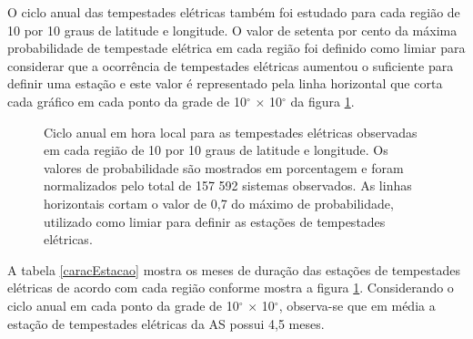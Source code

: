 
O ciclo anual das tempestades elétricas também foi estudado para cada região de 10 por 10 graus de latitude e longitude. O valor de setenta por cento da máxima probabilidade de tempestade elétrica em cada região foi definido como limiar para considerar que a ocorrência de tempestades elétricas aumentou o suficiente para definir uma estação e este valor é representado pela linha horizontal que corta cada gráfico em cada ponto da grade de 10$^{\circ}$ $\times$ 10$^{\circ}$ da figura \ref{anual}. 

\begin{figure}[!h]
\caption{Ciclo anual em hora local para as tempestades elétricas observadas em cada região de 10 por 10 graus de latitude e longitude. Os valores de probabilidade são mostrados em porcentagem e foram normalizados pelo total de {157 592} sistemas observados. As linhas horizontais cortam o valor de 0,7 do máximo de probabilidade, utilizado como limiar para definir as estações de tempestades elétricas.}
\label{anual}
\end{figure}

A tabela \ref{caracEstacao} mostra os meses de duração das estações de tempestades elétricas de acordo com cada região conforme mostra a figura \ref{anual}. Considerando o ciclo anual em cada ponto da grade de 10$^{\circ}$ $\times$ 10$^{\circ}$, observa-se que em média a estação de tempestades elétricas da AS possui 4,5 meses.

